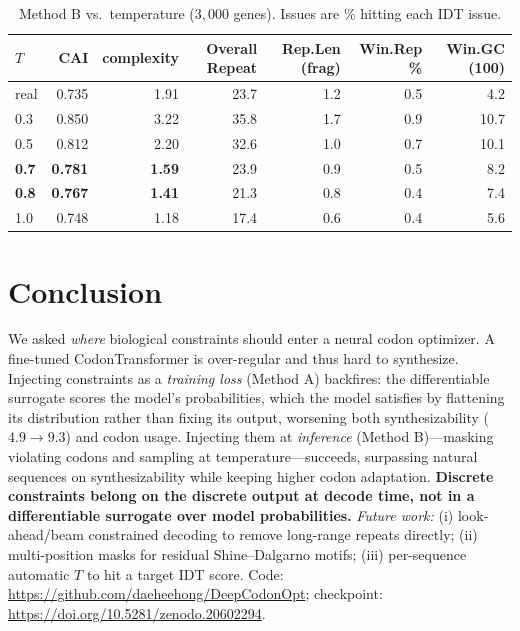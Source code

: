 \documentclass{article}
\begin{document}
\begin{table}[t]
\centering\small
\caption{Method B vs.\ temperature ($3{,}000$ genes). Issues are \% hitting each IDT issue.}
\label{tab:methodB}
\begin{tabular}{lrr@{\hskip 14pt}rrrr}
\toprule
$T$ & CAI & complexity & Overall Repeat & Rep.Len (frag) & Win.Rep \% & Win.GC (100) \\
\midrule
real & 0.735 & 1.91 & 23.7 & 1.2 & 0.5 & 4.2 \\
0.3  & 0.850 & 3.22 & 35.8 & 1.7 & 0.9 & 10.7 \\
0.5  & 0.812 & 2.20 & 32.6 & 1.0 & 0.7 & 10.1 \\
\textbf{0.7} & \textbf{0.781} & \textbf{1.59} & 23.9 & 0.9 & 0.5 & 8.2 \\
\textbf{0.8} & \textbf{0.767} & \textbf{1.41} & 21.3 & 0.8 & 0.4 & 7.4 \\
1.0  & 0.748 & 1.18 & 17.4 & 0.6 & 0.4 & 5.6 \\
\bottomrule
\end{tabular}
\end{table}

\section{Conclusion}

We asked \emph{where} biological constraints should enter a neural codon optimizer. A fine-tuned CodonTransformer is over-regular and thus hard to synthesize. Injecting constraints as a \emph{training loss} (Method A) backfires: the differentiable surrogate scores the model's probabilities, which the model satisfies by flattening its distribution rather than fixing its output, worsening both synthesizability ($4.9\!\to\!9.3$) and codon usage. Injecting them at \emph{inference} (Method B)---masking violating codons and sampling at temperature---succeeds, surpassing natural sequences on synthesizability while keeping higher codon adaptation. \textbf{Discrete constraints belong on the discrete output at decode time, not in a differentiable surrogate over model probabilities.} \emph{Future work:} (i) look-ahead/beam constrained decoding \cite{neurologic} to remove long-range repeats directly; (ii) multi-position masks for residual Shine--Dalgarno motifs; (iii) per-sequence automatic $T$ to hit a target IDT score. Code: \url{https://github.com/daeheehong/DeepCodonOpt}; checkpoint: \url{https://doi.org/10.5281/zenodo.20602294}.

\newpage


\end{document}
